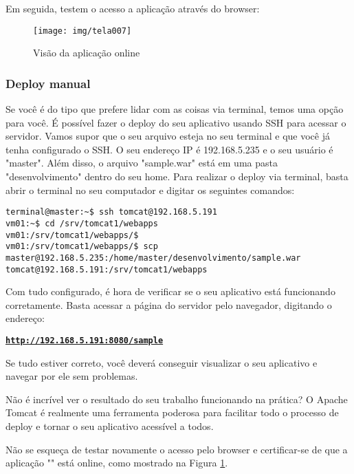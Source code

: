 \newpage
Em seguida, testem o acesso a aplicação através do browser:
\begin{figure}[H]
	\centering
	\caption[sample.war]{Visão da aplicação online}
	\texttt{[image: img/tela007]}
	\label{fig:showapp}
\end{figure}
\subsubsection{Deploy manual}

Se você é do tipo que prefere lidar com as coisas via terminal, temos uma opção para você. É possível fazer o deploy do seu aplicativo usando SSH para acessar o servidor. Vamos supor que o seu arquivo esteja no seu terminal e que você já tenha configurado o SSH. O seu endereço IP é 192.168.5.235 e o seu usuário é "master". Além disso, o arquivo "sample.war" está em uma pasta "desenvolvimento" dentro do seu home. Para realizar o deploy via terminal, basta abrir o terminal no seu computador e digitar os seguintes comandos:

\hypertarget{figura-smaple.war}{}
\begin{lstlisting}[breaklines=true,basicstyle=\ttfamily, 
label=acessosshVm0100 ,
breaklines=true,caption=\firacoderetina Acessar o servidor via ssh e efetuar o deploy via terminal,
postbreak=\mbox{\textcolor{red}{$\hookrightarrow$}\space},
showstringspaces=false]
terminal@master:~$ ssh tomcat@192.168.5.191
vm01:~$ cd /srv/tomcat1/webapps
vm01:/srv/tomcat1/webapps/$
vm01:/srv/tomcat1/webapps/$ scp master@192.168.5.235:/home/master/desenvolvimento/sample.war tomcat@192.168.5.191:/srv/tomcat1/webapps
\end{lstlisting}

Com tudo configurado, é hora de verificar se o seu aplicativo está funcionando corretamente. Basta acessar a página do servidor pelo navegador, digitando o endereço: 
\begin{center}
	\hyperlink{figura-smaple.war}{{\texttt{\textbf{http://192.168.5.191:8080/sample}}}}
\end{center}
Se tudo estiver correto, você deverá conseguir visualizar o seu aplicativo e navegar por ele sem problemas.

Não é incrível ver o resultado do seu trabalho funcionando na prática? O Apache Tomcat é realmente uma ferramenta poderosa para facilitar todo o processo de deploy e tornar o seu aplicativo acessível a todos.

Não se esqueça de testar novamente o acesso pelo browser e certificar-se de que a aplicação "" está online, como mostrado na Figura \ref{fig:showapp}.
